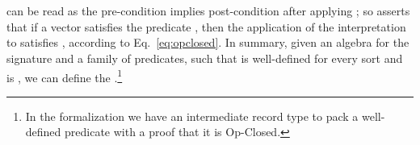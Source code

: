 \begin{code}
\>[0]\AgdaSpace{}%
\AgdaSymbol{:}\AgdaSpace{}%
\AgdaSymbol{(}
\AgdaSpace{}\AgdaSymbol{:}\AgdaSpace{}%
\AgdaSymbol{(}\AgdaSpace{}%
\AgdaSymbol{:}\AgdaSpace{}%
\AgdaSpace{}%
\AgdaSymbol{)}\AgdaSpace{}%
\AgdaSpace{}%
\AgdaSpace{}
 \AgdaSpace{}%
\AgdaSpace{}%
\AgdaSpace{}%
\AgdaSpace{}%
\AgdaSpace{}\AgdaSpace{}
\AgdaSpace{}%
\AgdaSymbol{)}
\AgdaSpace{}%
\AgdaSpace{}\<%
\\
\>[0]\AgdaSpace{}%
\AgdaSpace{}%
\AgdaSymbol{=}\AgdaSpace{}%
\AgdaSpace{}%
\AgdaSymbol{\{}\AgdaSpace{}%
\AgdaSymbol{\}}\AgdaSpace{}%
\AgdaSymbol{(}\AgdaSpace{}%
\AgdaSymbol{:}\AgdaSpace{}%
\AgdaSpace{}%
\AgdaSpace{}%
\AgdaSymbol{(}\AgdaSpace{}%
\AgdaOperator{\AgdaInductiveConstructor{,}}\AgdaSpace{}%
\AgdaSymbol{))}\AgdaSpace{}%
\AgdaSpace{}%
\AgdaSymbol{(}\AgdaSpace{}%
\AgdaSymbol{*}\AgdaSpace{}%
\AgdaSpace{}%
\AgdaSpace{}%
\AgdaSymbol{)}\AgdaSpace{}%
\AgdaSymbol{(}\AgdaSpace{}%
\AgdaSpace{}%
\AgdaSpace{}%
\AgdaSpace{}%
\AgdaSymbol{)}\<%
\\
\end{code}
\noindent
\AgdaSymbol{(}\AgdaSymbol{)}\AgdaSpace{}
can be read as the pre-condition  implies post-condition
 after applying ; so
\AgdaSpace{}\AgdaSpace{}
asserts that if a vector  satisfies the predicate
, then the application of the interpretation
\AgdaSpace{}%
\AgdaSpace{}%
\AgdaSpace{}%
 to  satisfies
, according to Eq.~\eqref{eq:opclosed}.  In summary,
given an algebra  for the signature  and a
family  of predicates, such that
\AgdaSpace{} is well-defined for every sort
 and  is , we can
define the
\AgdaSpace{}\AgdaSpace{}.\footnote{In
  the formalization we have an intermediate record type
   to pack a well-defined predicate with a proof
  that it is Op-Closed.}

